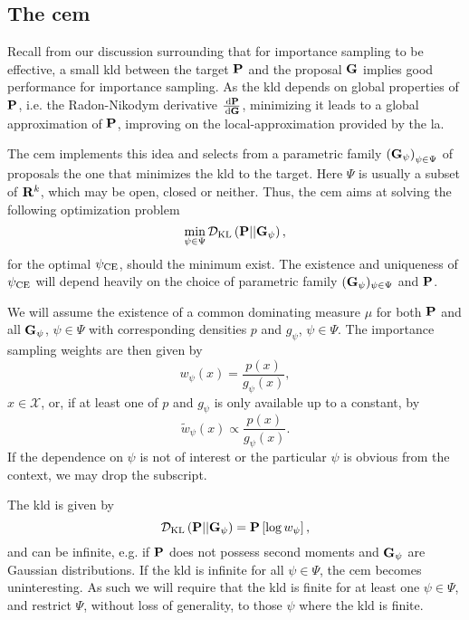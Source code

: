 \subsection{The \texorpdfstring{\Acrfull{cem}}{Cross-Entropy method}}
\label{subsec:cem}
Recall from our discussion surrounding  that for importance sampling to be effective, a small \acrshort{kld} between the target $\P$ and the proposal $\G$ implies good performance for importance sampling. As the \acrshort{kld} depends on global properties of $\P$, i.e. the Radon-Nikodym derivative $\rnd{\P}{\G}$, minimizing it leads to a global approximation of $\P$, improving on the local-approximation provided by the \acrshort{la}.

The \gls{cem} \citep{Rubinstein1999CrossEntropy,Rubinstein2004CrossEntropy} implements this idea and selects from a parametric family $ \left( \G_{\psi} \right)_{\psi \in \Psi}$ of proposals the one that minimizes the \gls{kld} to the target. Here $\Psi$ is usually a subset of $\R^{k}$, which may be open, closed or neither. Thus, the \acrshort{cem} aims at solving the following optimization problem
$$
    \min_{\psi \in \Psi} \Dkl{\P}{\G_{\psi}},
$$
for the optimal $\pce$, should the minimum exist. The existence and uniqueness of $\pce$ will depend heavily on the choice of parametric family $(\G_{\psi})_{\psi \in \Psi}$ and $\P$. 

We will assume the existence of a common dominating measure $\mu$ for both $\P$ and all $\G_{\psi}$, $\psi \in \Psi$ with corresponding densities $p$ and $g_{\psi}$, $\psi \in \Psi$. The importance sampling weights are then given by 
$$
w_{\psi}(x) = \frac{p(x)}{g_{\psi}(x)},
$$
$x \in \mathcal X$, or, if at least one of $p$ and $g_\psi$ is only available up to a constant, by 
$$
\tilde w_{\psi} (x) \propto \frac{p(x)}{g_{\psi}(x)}.
$$
If the dependence on $\psi$ is not of interest or the particular $\psi$ is obvious from the context, we may drop the subscript. 

The \acrshort{kld} is given by 
$$
    \Dkl{\P}{\G_{\psi}} = \P \left[ \log w_{\psi} \right],
$$
and can be infinite, e.g. if $\P$ does not possess second moments and $\G_{\psi}$ are Gaussian distributions. If the \acrshort{kld} is infinite for all $\psi\in\Psi$, the \acrshort{cem} becomes uninteresting. As such we will require that the \acrshort{kld} is finite for at least one $\psi \in \Psi$, and restrict $\Psi$, without loss of generality, to those $\psi$ where the \acrshort{kld} is finite. 

